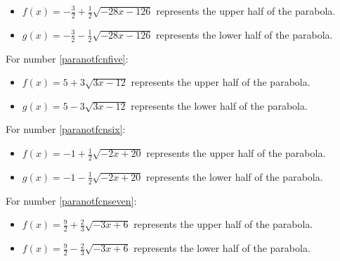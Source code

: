 \documentclass{ximera}
\begin{document}
\begin{problem}
\begin{solution}
\begin{itemize}
\item   $f(x) =-\frac{3}{2} + \frac{1}{2} \sqrt{-28x - 126}$ represents the upper half of the parabola.

\item  $g(x) =-\frac{3}{2} -  \frac{1}{2} \sqrt{-28x - 126}$  represents the lower half of the parabola.

\end{itemize}


For number \ref{paranotfcnfive}:

\begin{itemize}

\item   $f(x) =5+3 \sqrt{3x-12}$ represents the upper half of the parabola.

\item  $g(x) =5- 3 \sqrt{3x-12}$ represents the lower half of the parabola.

\end{itemize}


For number \ref{paranotfcnsix}:

\begin{itemize}

\item   $f(x) =-1 + \frac{1}{2} \sqrt{-2x+20}$ represents the upper half of the parabola.

\item  $g(x) =-1 - \frac{1}{2} \sqrt{-2x+20}$ represents the lower half of the parabola.

\end{itemize}

For number \ref{paranotfcnseven}:

\begin{itemize}

\item   $f(x) = \frac{9}{2} + \frac{2}{3} \sqrt{-3x+6}$ represents the upper half of the parabola.

\item  $f(x) = \frac{9}{2} - \frac{2}{3} \sqrt{-3x+6}$ represents the lower half of the parabola.

\end{itemize}
\end{solution}
\end{problem}
\end{document}

